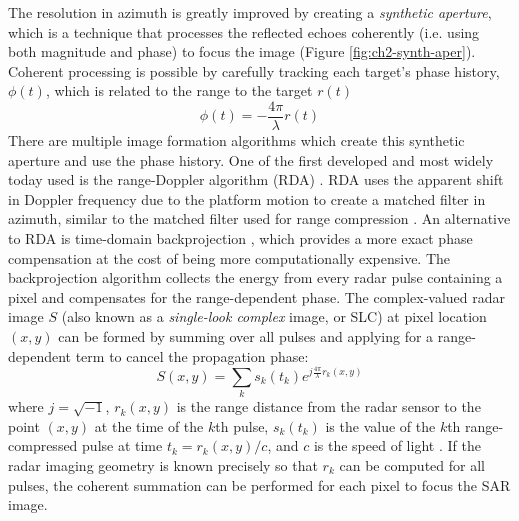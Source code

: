 The resolution in azimuth is greatly improved by creating a \emph{synthetic aperture}, which is a technique that processes the reflected echoes coherently (i.e. using both magnitude and phase) to focus the image (Figure \ref{fig:ch2-synth-aper}).
Coherent processing is possible by carefully tracking each target's phase history, $ \phi(t) $, which is related to the range to the target $r(t)$ 
\begin{equation}
\phi(t) = -\frac{4 \pi}{\lambda} r(t)  \label{eq:ch2-phase-range}
\end{equation}
There are multiple image formation algorithms which create this synthetic aperture and use the phase history. One of the first developed and most widely today used is the range-Doppler algorithm (RDA) \citep{Wu1976DigitalSystemProduce, Cumming1979DigitalProcessingSeasat}. 
RDA uses the apparent shift in Doppler frequency due to the platform motion to create a matched filter in azimuth, similar to the matched filter used for range compression \cite{Cumming2004DigitalProcessingSynthetic}.
An alternative to RDA is time-domain backprojection \citep{Duersch2013BackprojectionSyntheticAperture}, which provides a more exact phase compensation at the cost of being more computationally expensive.
The backprojection algorithm collects the energy from every radar pulse containing a pixel and compensates for the range-dependent phase.
The complex-valued radar image $S$ (also known as a \emph{single-look complex} image, or SLC) at pixel location $ (x, y) $ can be formed by summing over all pulses and applying for a range-dependent term to cancel the propagation phase:
\begin{equation}
	S(x, y) = \sum_{k} s_k \left(t_k \right) e^{j \frac{4 \pi}{\lambda} r_k(x, y)}
\end{equation}
where $j = \sqrt{-1}$, $r_k(x, y)$ is the range distance from the radar sensor to the point $ (x, y) $ at the time of the $k$th pulse, $s_k(t_k)$ is the value of the $k$th range-compressed pulse at time $t_k = r_k(x, y) / c$, and $c$ is the speed of light \citep{Zebker2018InsarMissionLevel}.
If the radar imaging geometry is known precisely so that $r_k$ can be computed for all pulses, the coherent summation can be performed for each pixel to focus the SAR image.

